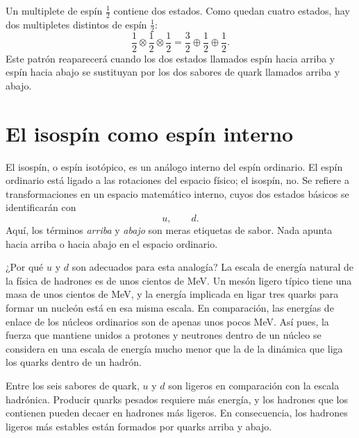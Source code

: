 Un multiplete de espín \(\tfrac12\) contiene dos estados. Como quedan cuatro estados, hay dos multipletes distintos de espín \(\tfrac12\):
\begin{equation}
\frac12\otimes\frac12\otimes\frac12
=
\frac32\oplus\frac12\oplus\frac12.
\end{equation}
Este patrón reaparecerá cuando los dos estados llamados espín hacia arriba y espín hacia abajo se sustituyan por los dos sabores de quark llamados arriba y abajo.

\section{El isospín como espín interno}

El isospín, o espín isotópico, es un análogo interno del espín ordinario. El espín ordinario está ligado a las rotaciones del espacio físico; el isospín, no. Se refiere a transformaciones en un espacio matemático interno, cuyos dos estados básicos se identificarán con
\begin{equation}
u,\qquad d.
\end{equation}
Aquí, los términos \emph{arriba} y \emph{abajo} son meras etiquetas de sabor. Nada apunta hacia arriba o hacia abajo en el espacio ordinario.


¿Por qué \(u\) y \(d\) son adecuados para esta analogía? La escala de energía natural de la física de hadrones es de unos cientos de MeV. Un mesón ligero típico tiene una masa de unos cientos de MeV, y la energía implicada en ligar tres quarks para formar un nucleón está en esa misma escala. En comparación, las energías de enlace de los núcleos ordinarios son de apenas unos pocos MeV. Así pues, la fuerza que mantiene unidos a protones y neutrones dentro de un núcleo se considera en una escala de energía mucho menor que la de la dinámica que liga los quarks dentro de un hadrón.

Entre los seis sabores de quark, \(u\) y \(d\) son ligeros en comparación con la escala hadrónica. Producir quarks pesados requiere más energía, y los hadrones que los contienen pueden decaer en hadrones más ligeros. En consecuencia, los hadrones ligeros más estables están formados por quarks arriba y abajo.

